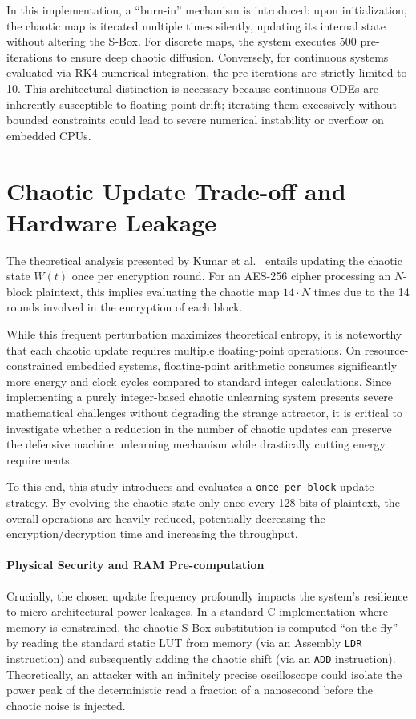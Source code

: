 \documentclass[11pt,a4paper]{report}
\begin{document}
In this implementation, a ``burn-in'' mechanism is introduced: upon initialization, the chaotic map is iterated multiple times silently, updating its internal state without altering the S-Box. 
For discrete maps, the system executes 500 pre-iterations to ensure deep chaotic diffusion. 
Conversely, for continuous systems evaluated via RK4 numerical integration, the pre-iterations are strictly limited to 10. 
This architectural distinction is necessary because continuous ODEs are inherently susceptible to floating-point drift; iterating them excessively without bounded constraints could lead to severe numerical instability or overflow on embedded CPUs.

\section{Chaotic Update Trade-off and Hardware Leakage}
The theoretical analysis presented by Kumar et al.~\cite{KumarPaper} entails updating the chaotic state $W(t)$ once per encryption round. 
For an AES-256 cipher processing an $N$-block plaintext, this implies evaluating the chaotic map $14 \cdot N$ times due to the 14 rounds involved in the encryption of each block.

While this frequent perturbation maximizes theoretical entropy, it is noteworthy that each chaotic update requires multiple floating-point operations. 
On resource-constrained embedded systems, floating-point arithmetic consumes significantly more energy and clock cycles compared to standard integer calculations. 
Since implementing a purely integer-based chaotic unlearning system presents severe mathematical challenges without degrading the strange attractor, 
it is critical to investigate whether a reduction in the number of chaotic updates can preserve the defensive machine unlearning mechanism while drastically cutting energy requirements. 

To this end, this study introduces and evaluates a \texttt{once-per-block} update strategy. 
By evolving the chaotic state only once every 128 bits of plaintext, the overall operations are heavily reduced, potentially decreasing the encryption/decryption time and increasing the throughput.

\paragraph{Physical Security and RAM Pre-computation}
Crucially, the chosen update frequency profoundly impacts the system's resilience to micro-architectural power leakages. 
In a standard C implementation where memory is constrained, the chaotic S-Box substitution is computed ``on the fly'' by reading the standard static LUT from memory (via an Assembly \texttt{LDR} instruction) and subsequently adding the chaotic shift (via an \texttt{ADD} instruction). 
Theoretically, an attacker with an infinitely precise oscilloscope could isolate the power peak of the deterministic read a fraction of a nanosecond before the chaotic noise is injected. 
\end{document}
